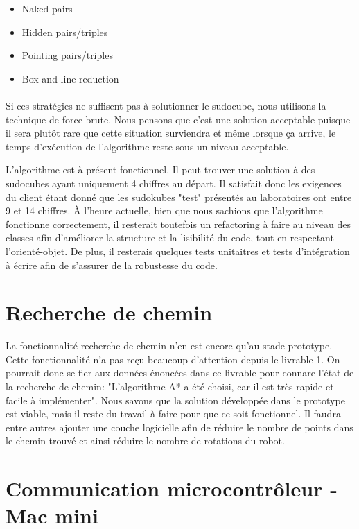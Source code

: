 \begin{itemize}
\item Naked pairs
\item Hidden pairs/triples
\item Pointing pairs/triples
\item Box and line reduction
\end{itemize}

\paragraph{}Si ces stratégies ne suffisent pas à solutionner le sudocube, nous utilisons la technique de force brute. Nous pensons que c'est une solution acceptable puisque il sera plutôt rare que cette situation surviendra et même lorsque ça arrive, le temps d'exécution de l'algorithme reste sous un niveau acceptable.

L'algorithme est à présent fonctionnel. Il peut trouver une solution à des sudocubes ayant uniquement 4 chiffres au départ. Il satisfait donc les exigences du client étant donné que les sudokubes "test" présentés au laboratoires ont entre 9 et 14 chiffres. À l'heure actuelle, bien que nous sachions que l'algorithme fonctionne correctement, il resterait toutefois un refactoring à faire au niveau des classes afin d'améliorer la structure et la lisibilité du code, tout en respectant l'orienté-objet. De plus, il resterais quelques tests unitaitres et tests d'intégration à écrire afin de s'assurer de la robustesse du code.

\section{Recherche de chemin}
La fonctionnalité recherche de chemin n’en est encore qu’au stade prototype. Cette fonctionnalité n'a pas reçu beaucoup d'attention depuis le livrable 1. On pourrait donc se fier aux données énoncées dans ce livrable pour connare l'état de la recherche de chemin: "L'algorithme A* a été choisi, car il est très rapide et facile à implémenter". Nous savons que la solution développée dans le prototype est viable, mais il reste du travail à faire pour que ce soit fonctionnel. Il faudra entre autres ajouter une couche logicielle afin de réduire le nombre de points dans le chemin trouvé et ainsi réduire le nombre de rotations du robot.

\section{Communication microcontrôleur - Mac mini}

